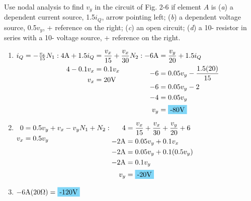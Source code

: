Use nodal analysis to find $v_y$ in the circuit of Fig. 2-6 if element $A$ is (\emph{a}) a dependent current source, 1.5$i_Q$, arrow pointing left; (\emph{b}) a dependent voltage source, 0.5$v_y$, + reference on the right; (\emph{c}) an open circuit; (\emph{d}) a 10-\qw{\ohm} resistor in series with a 10-\qw{\V} voltage source, + reference on the right.

\begin{enumerate}[leftmargin=2cm,labelsep=.5cm,label=\bfseries\alph*)]
	\item $ i_Q=-\frac{v_x}{15} \\[5mm] N_1: \\
	\begin{aligned}[t]
	4\qw{\A} + 1.5i_Q &= \frac{v_x}{15}+\frac{v_x}{30} \\
	4-0.1v_x &=0.1v_x \\
	v_x &= 20 \qw{\V}
	\end{aligned} 
	\\[5mm]
	N_2: \\
	\begin{aligned}[t]
	-6\qw{\A} &= \frac{v_y}{20}+1.5i_Q \\
	-6&= 0.05v_y-\frac{1.5(20)}{15} \\
	-6&= 0.05v_y-2 \\
    -4&= 0.05v_y \\
    v_y &= \hlbox{-80\qw{\V}}
	\end{aligned} $
	\\[1cm]
    
    \item $
	\begin{aligned}[t]
    0&=0.5v_y+v_x-v_y \\
	v_x &= 0.5v_y \\
	\end{aligned} 
	\\[5mm]
	N_1+N_2: \\
	\begin{aligned}[t]
	4 &= \frac{v_x}{15}+\frac{v_x}{30}+\frac{v_y}{20}+6 \\
	-2\qw{\A} &= 0.05v_y+0.1v_x \\
	-2\qw{\A} &= 0.05v_y+0.1(0.5v_y) \\
	-2\qw{\A} &= 0.1v_y \\
	v_y &= \hlbox{-20\qw{\V}}
	\end{aligned} $
	\\[1cm]
	
	\item $
	\begin{aligned}[t]
	-6\qw{\A}(20\qw{\ohm}) &= \hlbox{-120\qw{\V}}
	\end{aligned} $
	\\[1cm]
    \vfill
	

\end{enumerate}
